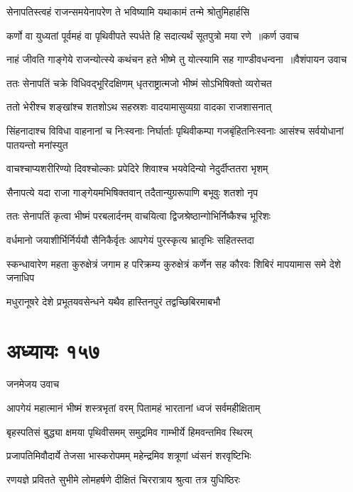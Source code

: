 \twolineshloka
{सेनापतिस्त्वहं राजन्समयेनापरेण ते}
{भविष्यामि यथाकामं तन्मे श्रोतुमिहार्हसि}


\threelineshloka
{कर्णो वा युध्यतां पूर्वमहं वा पृथिवीपते}
{स्पर्धते हि सदात्यर्थं सूतपुत्रो मया रणे ॥कर्ण उवाच}
{}


\threelineshloka
{नाहं जीवति गाङ्गेये राजन्योत्स्ये कथंचन}
{हते भीष्मे तु योत्स्यामि सह गाण्डीवधन्वना ॥वैशंपायन उवाच}
{}


\twolineshloka
{ततः सेनापतिं चक्रे विधिवद्भूरिदक्षिणम्}
{धृतराष्ट्रात्मजो भीष्मं सोऽभिषिक्तो व्यरोचत}


\twolineshloka
{ततो भेरीश्च शङ्खांश्च शतशोऽथ सहस्रशः}
{वादयामासुव्यग्रा वादका राजशासनात्}


सिंहनादाश्च विविधा वाहनानां च निःस्वनाः
\twolineshloka
{निर्घार्ताः पृथिवीकम्पा गजबृंहितनिःस्वनाः}
{आसंश्च सर्वयोधानां पातयन्तो मनांस्युत}


\twolineshloka
{वाचश्चाप्यशरीरिण्यो दिवश्चोल्काः प्रपेदिरे}
{शिवाश्च भयवेदिन्यो नेदुर्दीप्ततरा भृशम्}


\twolineshloka
{सैनापत्ये यदा राजा गाङ्गेयमभिषिक्तवान्}
{तदैतान्युग्ररूपाणि बभूवुः शतशो नृप}


\twolineshloka
{ततः सेनापतिं कृत्वा भीष्मं परबलार्दनम्}
{वाचयित्वा द्विजश्रेष्ठान्गोभिर्निष्कैश्च भूरिशः}


\twolineshloka
{वर्धमानो जयाशीर्भिर्निर्ययौ सैनिकैर्वृतः}
{आपगेयं पुरस्कृत्य भ्रातृभिः सहितस्तदा}


स्कन्धावारेण महता कुरुक्षेत्रं जगाम ह
\twolineshloka
{परिक्रम्य कुरुक्षेत्रं कर्णेन सह कौरवः}
{शिबिरं मापयामास समे देशे जनाधिप}


\twolineshloka
{मधुरानूषरे देशे प्रभूतयवसेन्धने}
{यथैव हास्तिनपुरं तद्वच्छिबिरमाबभौ}


\chapter{अध्यायः १५७}
\twolineshloka
{जनमेजय उवाच}
{}


\twolineshloka
{आपगेयं महात्मानं भीष्मं शस्त्रभृतां वरम्}
{पितामहं भारतानां ध्वजं सर्वमहीक्षिताम्}


\twolineshloka
{बृहस्पतिसं बुद्ध्या क्षमया पृथिवीसमम्}
{समुद्रमिव गाम्भीर्ये हिमवन्तमिव स्थिरम्}


\twolineshloka
{प्रजापतिमिवौदार्ये तेजसा भास्करोपमम्}
{महेन्द्रमिव शत्रूणां ध्वंसनं शरवृष्टिभिः}


\twolineshloka
{रणयज्ञे प्रवितते सुभीमे लोमहर्षणे}
{दीक्षितं चिररात्राय श्रुत्वा तत्र युधिष्ठिरः}


